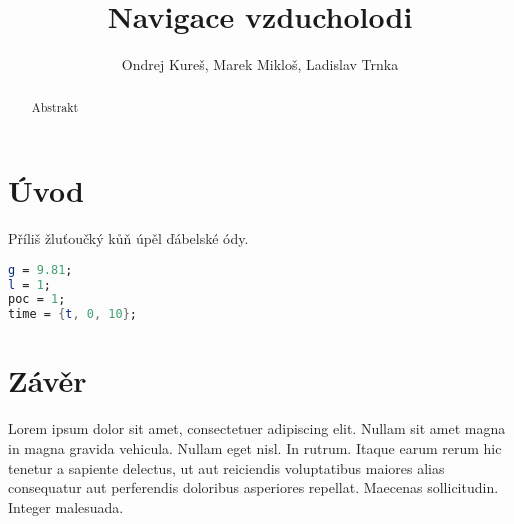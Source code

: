 \documentclass[reqno, a4paper]{amsart}
\title[Matematické kyvadlo]{Navigace vzducholodi}
\author{Ondrej Kureš, Marek Mikloš, Ladislav Trnka}
\numberwithin{equation}{section}
\begin{document}
\begin{abstract}
Abstrakt
\end{abstract}

\maketitle

\tableofcontents



\section{Úvod}
\label{sec:Úvod}

Příliš žluťoučký kůň úpěl ďábelské ódy.

\begin{lstlisting}[language=Mathematica, caption=Konstanty]
g = 9.81;
l = 1;
poc = 1;
time = {t, 0, 10};
\end{lstlisting}

\section{Závěr}
\label{sec:Závěr}
Lorem ipsum dolor sit amet, consectetuer adipiscing elit. Nullam sit amet magna in magna gravida vehicula. Nullam eget nisl. In rutrum. Itaque earum rerum hic tenetur a sapiente delectus, ut aut reiciendis voluptatibus maiores alias consequatur aut perferendis doloribus asperiores repellat. Maecenas sollicitudin. Integer malesuada.





















%
%
%

\end{document}
